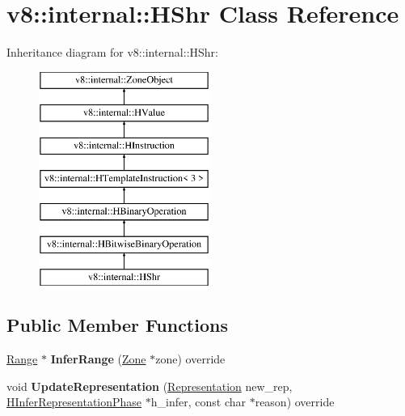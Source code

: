 \hypertarget{classv8_1_1internal_1_1_h_shr}{}\section{v8\+:\+:internal\+:\+:H\+Shr Class Reference}
\label{classv8_1_1internal_1_1_h_shr}
Inheritance diagram for v8\+:\+:internal\+:\+:H\+Shr\+:\begin{figure}[H]
\begin{center}
\leavevmode
\includegraphics[height=7.000000cm]{classv8_1_1internal_1_1_h_shr}
\end{center}
\end{figure}
\subsection*{Public Member Functions}
\begin{DoxyCompactItemize}
\item 
\hyperlink{classv8_1_1internal_1_1_range}{Range} $\ast$ {\bfseries Infer\+Range} (\hyperlink{classv8_1_1internal_1_1_zone}{Zone} $\ast$zone) override\hypertarget{classv8_1_1internal_1_1_h_shr_a83e6487166ae120440b67c8f1c3d5795}{}\label{classv8_1_1internal_1_1_h_shr_a83e6487166ae120440b67c8f1c3d5795}

\item 
void {\bfseries Update\+Representation} (\hyperlink{classv8_1_1internal_1_1_representation}{Representation} new\+\_\+rep, \hyperlink{classv8_1_1internal_1_1_h_infer_representation_phase}{H\+Infer\+Representation\+Phase} $\ast$h\+\_\+infer, const char $\ast$reason) override\hypertarget{classv8_1_1internal_1_1_h_shr_ab171ccb4f71cce1c8069a51a26374c1d}{}\label{classv8_1_1internal_1_1_h_shr_ab171ccb4f71cce1c8069a51a26374c1d}

\end{DoxyCompactItemize}
